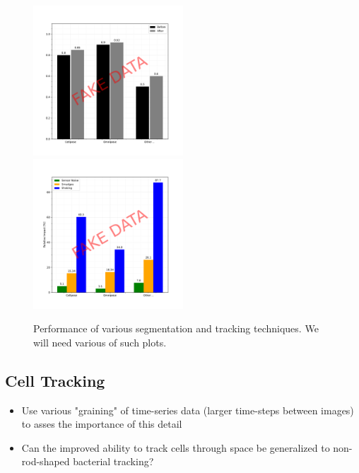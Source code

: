 \documentclass{article}
\begin{document}
\begin{figure}
    \centering
    \includegraphics[width=0.5\textwidth]{fake-figures/segmentation-benchmark.pdf}%
    \includegraphics[width=0.5\textwidth]{fake-figures/tracking-defects.pdf}
    \caption{
        Performance of various segmentation and tracking techniques.
        We will need various of such plots.
    }
\end{figure}

\subsection{Cell Tracking}
\begin{itemize}
    \item Use various "graining" of time-series data (larger time-steps between images) to asses the
        importance of this detail
    \item Can the improved ability to track cells through space be generalized to non-rod-shaped
        bacterial tracking?
\end{itemize}

\end{document}
